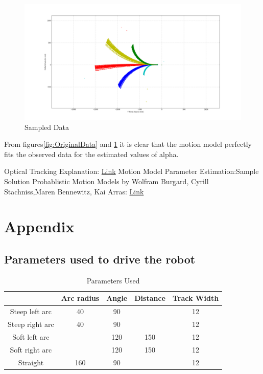 \documentclass[10pt]{scrartcl}
\begin{document}
\begin{figure}[H]
\centering
\includegraphics[scale=0.25]{images/figure_2}
\caption{Sampled Data}
\label{fig:SampledData}
\end{figure}        

From figures\ref{fig:OriginalData} and \ref{fig:SampledData} it is clear that the motion model perfectly fits the observed data for the estimated values of alpha.

\begin{thebibliography}{1}
 Optical Tracking Explanation: \href{http://www.ps-tech.com/3d-technology/optical-tracking}{Link}
 Motion Model Parameter Estimation:Sample Solution
 Probablistic Motion Models by Wolfram Burgard, Cyrill Stachniss,Maren Bennewitz, Kai Arras:   \href{http://ais.informatik.uni-freiburg.de/teaching/ss11/robotics/slides/06-motion-models.pdf} {Link}
\end{thebibliography}


\section{Appendix}

\subsection{Parameters used to drive the robot}

\begin{table}[h!]
\centering
\caption{Parameters Used}
\label{tab:1}
\begin{tabular}{|c|c|c|c|c|} \hline
 				& Arc radius& Angle & Distance & Track Width \\ \hline
Steep left arc  & 40        & 90    &          & 12 \\ \hline
Steep right arc & 40        & 90    &          & 12 \\ \hline
Soft left arc   &           & 120    & 150       & 12 \\ \hline
Soft right arc  &           & 120    & 150       & 12 \\ \hline
Straight        & 160        & 90    &          & 12 \\ \hline
 
\end{tabular}
\end{table}
\end{document}
